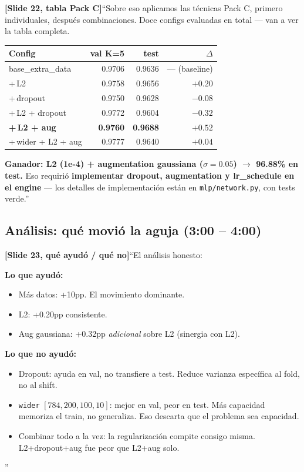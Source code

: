 \documentclass[11pt,a4paper]{article}
\newcommand{\code}[1]{\texttt{\textcolor{accent}{#1}}}
\newcommand{\file}[1]{\texttt{\small #1}}
\newcommand{\slidenum}[1]{\textcolor{accent}{\textbf{[Slide #1]}}}
\newcommand{\timing}[1]{\textcolor{muted}{\small (#1)}}
\begin{document}
\slidenum{22, tabla Pack C}\quad ``Sobre eso aplicamos las técnicas Pack C, primero individuales, después combinaciones. Doce configs evaluadas en total --- van a ver la tabla completa.

\begin{center}\small
\begin{tabular}{@{}lrrr@{}}
\toprule
Config & val K=5 & test & $\Delta$ \\
\midrule
base\_extra\_data           & 0.9706 & 0.9636 & --- (baseline) \\
\quad +\,L2                 & 0.9758 & 0.9656 & $+0.20$ \\
\quad +\,dropout            & 0.9750 & 0.9628 & $-0.08$ \\
\quad +\,L2 + dropout       & 0.9772 & 0.9604 & $-0.32$ \\
\textbf{\quad +\,L2 + aug}  & \textbf{0.9760} & \textbf{0.9688} & $\boldsymbol{+0.52}$ \\
\quad +\,wider + L2 + aug   & 0.9777 & 0.9640 & $+0.04$ \\
\bottomrule
\end{tabular}
\end{center}

\textbf{Ganador: L2 (1e-4) + augmentation gaussiana (\(\sigma=0.05\)) \(\to\) 96.88\% en test.} Eso requirió \textbf{implementar dropout, augmentation y lr\_schedule en el engine} --- los detalles de implementación están en \file{mlp/network.py}, con tests verde.''

\subsection{Análisis: qué movió la aguja \timing{3:00 -- 4:00}}

\slidenum{23, qué ayudó / qué no}\quad ``El análisis honesto:

\textbf{Lo que ayudó:}
\begin{itemize}[leftmargin=1.4em, itemsep=1pt]
  \item Más datos: +10pp. El movimiento dominante.
  \item L2: +0.20pp consistente.
  \item Aug gaussiana: +0.32pp \emph{adicional} sobre L2 (sinergia con L2).
\end{itemize}

\textbf{Lo que no ayudó:}
\begin{itemize}[leftmargin=1.4em, itemsep=1pt]
  \item Dropout: ayuda en val, no transfiere a test. Reduce varianza específica al fold, no al shift.
  \item \code{wider} \([784,200,100,10]\): mejor en val, peor en test. Más capacidad memoriza el train, no generaliza. Eso descarta que el problema sea capacidad.
  \item Combinar todo a la vez: la regularización compite consigo misma. L2+dropout+aug fue peor que L2+aug solo.
\end{itemize}''
\end{document}
